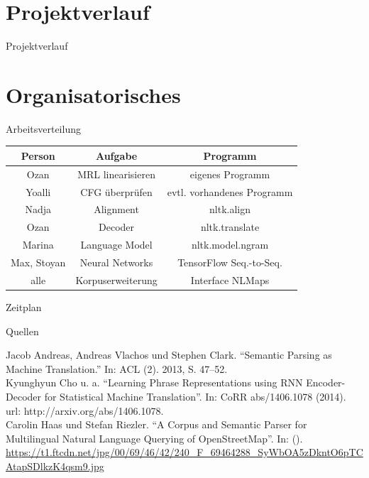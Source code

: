 \documentclass[note=hide]{beamer} %
\begin{document}
\section{Projektverlauf}
\begin{frame}{Projektverlauf}
	\begin{figure}[H]
		\centering{
			\resizebox{0.5\textwidth}{!}{}}		
	\end{figure}
\end{frame}
\section{Organisatorisches}
\begin{frame}{Arbeitsverteilung}
	\begin{table}[H]
		\normalsize		
		\begin{tabular}{|c|c|c|}
			\hline
			\textbf{Person} & \textbf{Aufgabe}  & \textbf{Programm} \\
			\hline
			Ozan & MRL linearisieren & eigenes Programm \\
			\hline
			Yoalli & CFG überprüfen & evtl. vorhandenes Programm \\ 
			\hline
			Nadja & Alignment & nltk.align \\
			\hline
			Ozan & Decoder & nltk.translate \\
			\hline
			Marina & Language Model & nltk.model.ngram \\
			\hline
			Max, Stoyan & Neural Networks & TensorFlow Seq.-to-Seq.\\
			\hline
			alle & Korpuserweiterung & Interface NLMaps\\
			\hline			
		\end{tabular}		
	\end{table}
\end{frame}	

\begin{frame}{Zeitplan}
	\begin{figure}[H]
		\centering{
			\resizebox{0.9\textwidth}{!}{}}		
	\end{figure}	
\end{frame}

\begin{frame}{Quellen}
	
	Jacob Andreas, Andreas Vlachos und Stephen Clark. “Semantic Parsing as
	Machine Translation.” In: ACL (2). 2013, S. 47–52. \\ \vspace{5pt}
	Kyunghyun Cho u. a. “Learning Phrase Representations using RNN Encoder-
	Decoder for Statistical Machine Translation”. In: CoRR abs/1406.1078 (2014).
	url: http://arxiv.org/abs/1406.1078. \\ \vspace{5pt}
	Carolin Haas und Stefan Riezler. “A Corpus and Semantic Parser for Multilingual
	Natural Language Querying of OpenStreetMap”. In: ().\\ \vspace{5pt}
	\url{https://t1.ftcdn.net/jpg/00/69/46/42/240_F_69464288_SyWbOA5zDkntO6pTCAtapSDlkzK4qsm9.jpg}
\end{frame}
\end{document}
